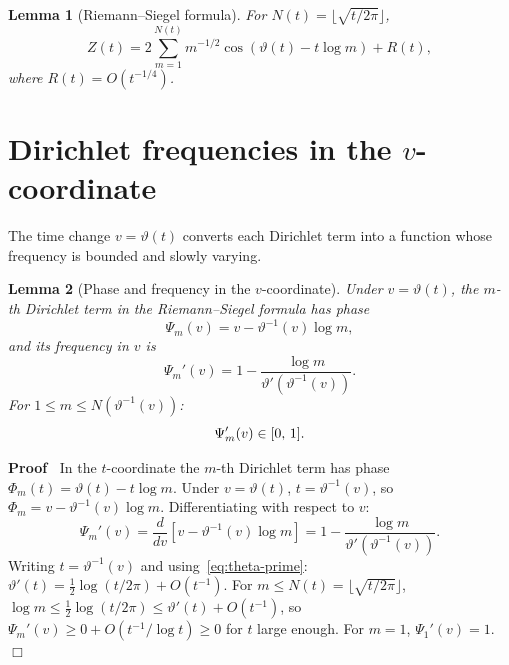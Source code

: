 \documentclass{article}
\newenvironment{proof}{\noindent\textbf{Proof\ }}{\hspace*{\fill}$\Box$\medskip}
\newtheorem{lemma}{Lemma}
\begin{document}
\begin{lemma}
  [Riemann--Siegel formula]\label{lem:RS} For $N (t) = \lfloor \sqrt{t / 2
  \pi} \rfloor$,
  \begin{equation}
    \label{eq:RS} Z (t) = 2 \sum_{m = 1}^{N (t)} m^{- 1 / 2} \cos (\vartheta
    (t) - t \log m) + R (t),
  \end{equation}
  where $R (t) = O (t^{- 1 / 4})$.
\end{lemma}

\section{Dirichlet frequencies in the $v$-coordinate}\label{sec:frequencies}

The time change $v = \vartheta (t)$ converts each Dirichlet term into a
function whose frequency is bounded and slowly varying.

\begin{lemma}
  [Phase and frequency in the $v$-coordinate]\label{lem:v-freq} Under $v =
  \vartheta (t)$, the $m$-th Dirichlet term in the Riemann--Siegel formula has
  phase
  \begin{equation}
    \label{eq:phase-v} \Psi_m (v) = v - \vartheta^{- 1} (v) \log m,
  \end{equation}
  and its frequency in $v$ is
  \begin{equation}
    \label{eq:freq-v} \Psi_m' (v) = 1 - \frac{\log m}{\vartheta' (\vartheta^{-
    1} (v))} .
  \end{equation}
  For $1 \le m \le N (\vartheta^{- 1} (v))$:
  \begin{equation}
    \label{eq:freq-range} \Psi_m' (v) \in [0, \hspace{0.17em} 1] .
  \end{equation}
\end{lemma}

\begin{proof}
  In the $t$-coordinate the $m$-th Dirichlet term has phase $\Phi_m (t) =
  \vartheta (t) - t \log m$. Under $v = \vartheta (t)$, $t = \vartheta^{- 1}
  (v)$, so $\Phi_m = v - \vartheta^{- 1} (v) \log m$. Differentiating with
  respect to $v$:
  \[ \Psi_m' (v) = \frac{d}{dv}  [v - \vartheta^{- 1} (v) \log m] = 1 -
     \frac{\log m}{\vartheta' (\vartheta^{- 1} (v))} . \]
  Writing $t = \vartheta^{- 1} (v)$ and using~\eqref{eq:theta-prime}:
  $\vartheta' (t) = \tfrac{1}{2} \log (t / 2 \pi) + O (t^{- 1})$. For $m \le N
  (t) = \lfloor \sqrt{t / 2 \pi} \rfloor$, $\log m \le \tfrac{1}{2} \log (t /
  2 \pi) \le \vartheta' (t) + O (t^{- 1})$, so $\Psi_m' (v) \ge 0 + O (t^{- 1}
  / \log t) \ge 0$ for $t$ large enough. For $m = 1$, $\Psi_1' (v) = 1$.
\end{proof}
\end{document}
